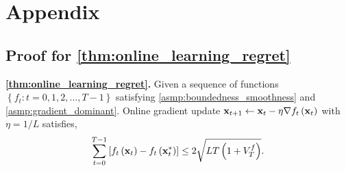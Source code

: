 \section{Appendix}

\subsection{Proof for \cref{thm:online_learning_regret}}

\textbf{\cref{thm:online_learning_regret}.} Given a sequence of functions $\left\{ f_t : t = 0, 1, 2, \dots, T-1 \right\}$ satisfying \cref{asmp:boundedness_smoothness} and \cref{asmp:gradient_dominant}. Online gradient update ${\mathbf{x}}_{t+1} \gets {\mathbf{x}}_{t} - \eta \nabla f_{t}\left({\mathbf{x}}_{t}\right)$ with $\eta = 1/L$ satisfies,
\begin{equation*}
\begin{split}
    \sum\limits_{t=0}^{T-1}{\left[ f_t\left({\mathbf{x}}_t\right) - f_t\left( {\mathbf{x}}_t^* \right) \right]} \le 2 \sqrt{L T \left( 1 + V_T^f \right)}.
\end{split}
\end{equation*}
